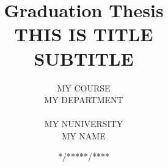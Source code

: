 \documentclass[report,10.5pt,a4paper,oneside,openany,uplatex]{jsbook}
\title{
  \vspace{-30truemm}
  {\Large Graduation Thesis}\\
  \vspace{5truemm}
  \vspace{15truemm}
  {\Huge THIS IS TITLE}\\
  \vspace{3truemm}
  {\Large SUBTITLE}
  \vspace{90truemm}
}
\author{
   {\large MY COURSE} \\
  {\large MY DEPARTMENT}\\ \\
  \vspace{10truemm}
  {\Large MY NUNIVERSITY}\\
  \vspace{10truemm}
  {\LARGE MY NAME}
}
\date{{\Large **/*****/****}}
\renewcommand{\figurename}{Figure }
\renewcommand{\tablename}{Table }
\begin{document}
\maketitle              %
\thispagestyle{empty}   %
\setcounter{page}{1}    %
\tableofcontents        %
{%
\let\oldnumberline\numberline%
\renewcommand{\numberline}{\figurename~\oldnumberline}%
\listoffigures%
} 
{%
\let\oldnumberline\numberline%
\renewcommand{\numberline}{\tablename~\oldnumberline}%
\listoftables %
} 
 
 


\def\thesection{\Alph{section}}
\appendix
\renewcommand{\thefigure}{A.\arabic{figure}}
\renewcommand{\thetable}{A.\arabic{table}}
\setcounter{figure}{0}
\setcounter{table}{0}


\renewcommand{\thefigure}{B.\arabic{figure}}
\renewcommand{\thesubsection}{B.\arabic{subsection}}
\renewcommand{\thetable}{B.\arabic{table}}
\setcounter{figure}{0}
\setcounter{table}{0}



\renewcommand{\bibname}{References}



\end{document}
